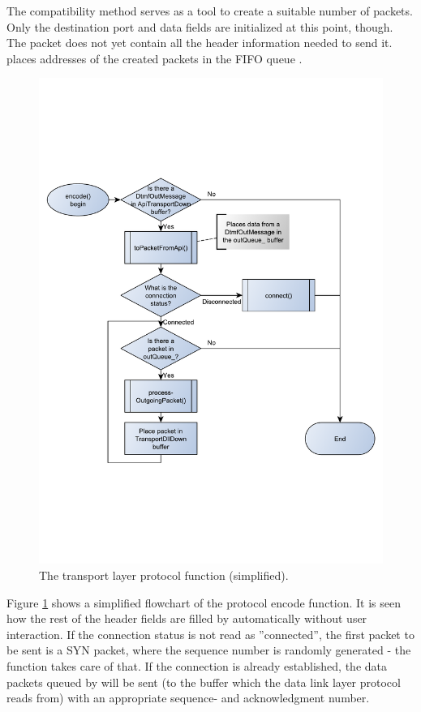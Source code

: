 The compatibility method  serves as a tool to create a suitable number of packets. Only the destination port and data fields are initialized at this point, though. The packet does not yet contain all the header information needed to send it.  places addresses of the created packets in the FIFO queue .

\begin{figure}[htb]
 \centering
 \includegraphics[scale=0.66,trim=0 170 0 170]{content/graphics/transport/trans_encode_flowchart_simple.pdf}%
 \caption{The transport layer protocol  function (simplified).}
 \label{fig:trans_encode_flowchart_simple}
\end{figure}

Figure \ref{fig:trans_encode_flowchart_simple} shows a simplified flowchart of the protocol encode function. It is seen how the rest of the header fields are filled by  automatically without user interaction. If the connection status is not read as ''connected'', the first packet to be sent is a SYN packet, where the sequence number is randomly generated - the  function takes care of that. If the connection is already established, the data packets queued by  will be sent (to the  buffer which the data link layer protocol reads from) with an appropriate sequence- and acknowledgment number.

